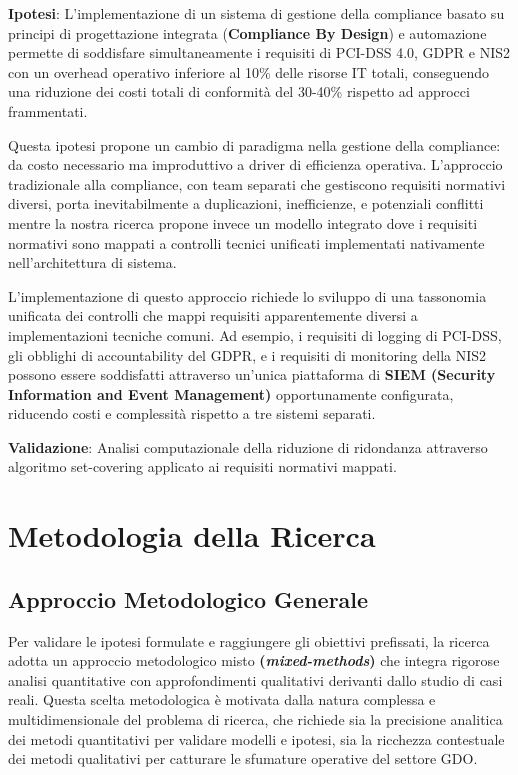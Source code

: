 \textbf{Ipotesi}: L'implementazione di un sistema di gestione della compliance basato su principi di progettazione integrata (\textbf{Compliance By Design}) e automazione permette di soddisfare simultaneamente i requisiti di PCI-DSS 4.0, GDPR e NIS2 con un overhead operativo inferiore al 10\% delle risorse IT totali, conseguendo una riduzione dei costi totali di conformità del 30-40\% rispetto ad approcci frammentati.

Questa ipotesi propone un cambio di paradigma nella gestione della compliance: da costo necessario ma improduttivo a driver di efficienza operativa. L'approccio tradizionale alla compliance, con team separati che gestiscono requisiti normativi diversi, porta inevitabilmente a duplicazioni, inefficienze, e potenziali conflitti mentre la nostra ricerca propone invece un modello integrato dove i requisiti normativi sono mappati a controlli tecnici unificati implementati nativamente nell'architettura di sistema.

L'implementazione di questo approccio richiede lo sviluppo di una tassonomia unificata dei controlli che mappi requisiti apparentemente diversi a implementazioni tecniche comuni. Ad esempio, i requisiti di logging di PCI-DSS, gli obblighi di accountability del GDPR, e i requisiti di monitoring della NIS2 possono essere soddisfatti attraverso un'unica piattaforma di \textbf{SIEM (Security Information and Event Management)} opportunamente configurata, riducendo costi e complessità rispetto a tre sistemi separati.

\textbf{Validazione}: Analisi computazionale della riduzione di ridondanza attraverso algoritmo set-covering applicato ai requisiti normativi mappati.

\section{Metodologia della Ricerca}

\subsection{Approccio Metodologico Generale}

Per validare le ipotesi formulate e raggiungere gli obiettivi prefissati, la ricerca adotta un approccio metodologico misto \textbf{(\textit{mixed-methods})} che integra rigorose analisi quantitative con approfondimenti qualitativi derivanti dallo studio di casi reali. Questa scelta metodologica è motivata dalla natura complessa e multidimensionale del problema di ricerca, che richiede sia la precisione analitica dei metodi quantitativi per validare modelli e ipotesi, sia la ricchezza contestuale dei metodi qualitativi per catturare le sfumature operative del settore GDO.

